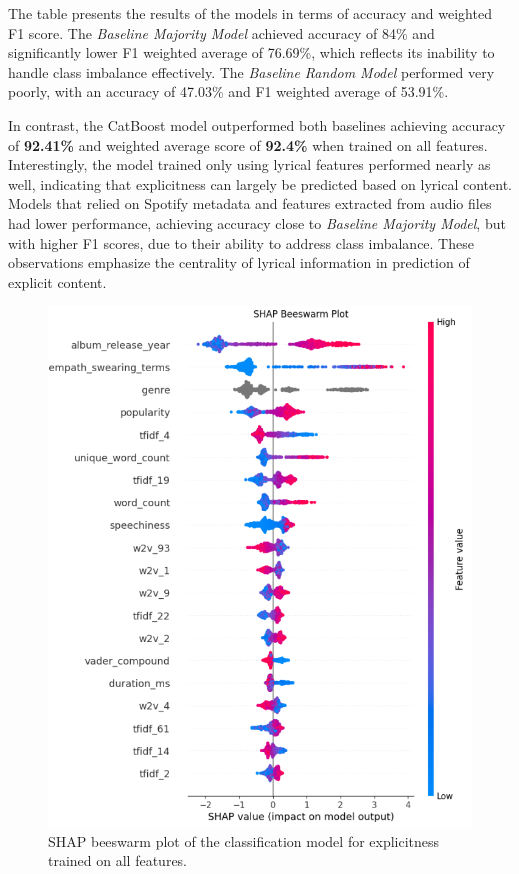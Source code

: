 The table presents the results of the models in terms of accuracy and weighted
F1 score. The \textit{Baseline Majority Model} achieved accuracy of 84\% and
significantly lower F1 weighted average of 76.69\%, which reflects its inability
to handle class imbalance effectively. The \textit{Baseline Random Model}
performed very poorly, with an accuracy of 47.03\% and F1 weighted average of
53.91\%.

In contrast, the CatBoost model outperformed both baselines achieving accuracy
of \textbf{92.41\%} and weighted average score of \textbf{92.4\%} when trained
on all features. Interestingly, the model trained only using lyrical features
performed nearly as well, indicating that explicitness can largely be predicted
based on lyrical content. Models that relied on Spotify metadata and features
extracted from audio files had lower performance, achieving accuracy close to
\textit{Baseline Majority Model}, but with higher F1 scores, due to their
ability to address class imbalance. These observations emphasize the centrality
of lyrical information in prediction of explicit content.


\begin{center}
\begin{figure}[H]
  \centering
  \includegraphics[width=5in]{img/beeswarm_explicitness.png}
  \caption{SHAP beeswarm plot of the classification model for explicitness trained on all features.}
  \label{Figure:fig_beh}
\end{figure}
\end{center}

